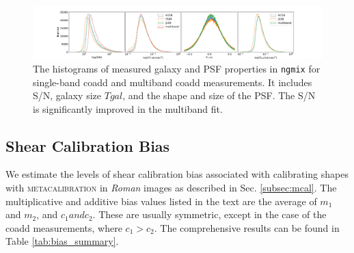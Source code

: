 \documentclass[fleqn,usenatbib]{mnras}
\begin{document}
\begin{figure}
    \hspace*{-3.0cm}
    \centering
	\includegraphics[scale=0.34]{ngmix_snr_T.pdf}
    \caption{The histograms of measured galaxy and PSF properties in \texttt{ngmix} for single-band coadd and multiband coadd measurements. It includes S/N, galaxy size $T{gal}$, and the shape and size of the PSF. The S/N is significantly improved in the multiband fit.}
    \label{fig:measured_properties}
\end{figure}


\subsection{Shear Calibration Bias}
\label{subsec:shapes}
We estimate the levels of shear calibration bias associated with calibrating shapes with \textsc{metacalibration} in \emph{Roman} images as described in Sec. \ref{subsec:mcal}. The multiplicative and additive bias values listed in the text are the average of $m_{1}$ and $m_{2}$, and $c_{1} and c_{2}$. These are usually symmetric, except in the case of the coadd measurements, where $c_1>c_2$. The comprehensive results can be found in Table \ref{tab:bias_summary}.  
\end{document}
